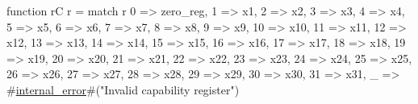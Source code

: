 function rC r = {
  match r {
    0  => zero_reg,
    1  => x1,
    2  => x2,
    3  => x3,
    4  => x4,
    5  => x5,
    6  => x6,
    7  => x7,
    8  => x8,
    9  => x9,
    10 => x10,
    11 => x11,
    12 => x12,
    13 => x13,
    14 => x14,
    15 => x15,
    16 => x16,
    17 => x17,
    18 => x18,
    19 => x19,
    20 => x20,
    21 => x21,
    22 => x22,
    23 => x23,
    24 => x24,
    25 => x25,
    26 => x26,
    27 => x27,
    28 => x28,
    29 => x29,
    30 => x30,
    31 => x31,
    _  => #\hyperref[sailRISCVzinternalzyerror]{internal\_error}#("Invalid capability register")
  }
}
